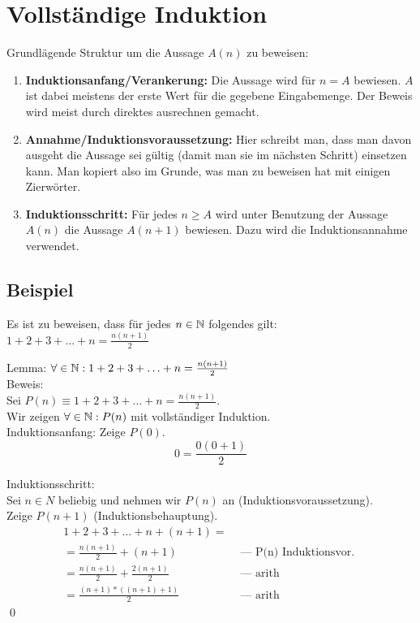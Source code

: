 \section{Vollständige Induktion}
Grundlägende Struktur um die Aussage $A(n)$ zu beweisen:
\begin{enumerate}
	\item \textbf{Induktionsanfang/Verankerung:} Die Aussage wird für $n = A$ bewiesen.
	$A$ ist dabei meistens der erste Wert für die gegebene Eingabemenge.
	Der Beweis wird meist durch direktes ausrechnen gemacht.
	\item \textbf{Annahme/Induktionsvoraussetzung:} Hier schreibt man,
	dass man davon ausgeht die Aussage sei gültig (damit man sie im nächsten Schritt)
	einsetzen kann. Man kopiert also im Grunde, was man zu beweisen hat mit einigen Zierwörter.
	\item \textbf{Induktionsschritt:} Für jedes $n \geq A$ wird unter Benutzung der Aussage $A(n)$
	die Aussage $A(n+1)$ bewiesen. Dazu wird die Induktionsannahme verwendet.
\end{enumerate}

\subsection{Beispiel}
		Es ist zu beweisen, dass für jedes $n \in \mathbb{N}$ folgendes gilt: $1 + 2 + 3 + \ldots + n = \frac{n(n + 1)}{2}$		
		
		Lemma: $\forall \in \mathbb{N}: 1 + 2 + 3 + \ldots + n = \frac{n(n + 1)}{2}$ \\
		
	Beweis: \\
		  Sei $P(n) \equiv 1 + 2 + 3 + \ldots + n = \frac{n(n + 1)}{2}$. \\
		  Wir zeigen $\forall \in \mathbb{N}: P(n)$ mit vollständiger Induktion.\\
		
		Induktionsanfang: Zeige $P(0)$. \\
		 $$0 =  \frac{0(0 + 1)}{2}$$
		
		  Induktionsschritt: \\
		    Sei $n \in N$ beliebig und nehmen wir $P(n)$ an (Induktionsvoraussetzung).  \\
		    Zeige $P(n+1)$ (Induktionsbehauptung).\\
		  \begin{align}
		      1 + 2 + 3 + \ldots + n + (n + 1) =\\
		      = \frac{n(n + 1)}{2} + (n+1)       & \text{ — P(n) Induktionsvor. }\\
		      = \frac{n(n + 1)}{2} + \frac{2(n + 1)}{2}  & \text{ — arith}\\
		      = \frac{(n+1)*((n+1)+1)}{2}        & \text{ — arith}
		\end{align}
		\qed